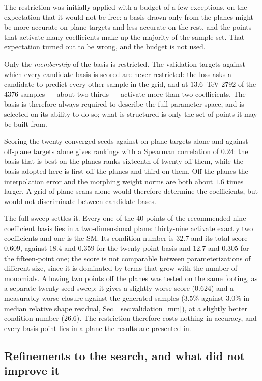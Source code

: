 The restriction was initially applied with a budget of a few exceptions, on the
expectation that it would not be free: a basis drawn only from the planes might
be more accurate on plane targets and less accurate on the rest, and the points
that activate many coefficients make up the majority of the sample set. That
expectation turned out to be wrong, and the budget is not used.

Only the \emph{membership} of the basis is restricted. The
validation targets against which every candidate basis is scored are never restricted:
the loss asks a candidate to predict every other sample in the grid, and at $13.6$~TeV
$2792$ of the $4376$ samples --- about two thirds --- activate more than two
coefficients. The basis is therefore always required to describe the full parameter
space, and is selected on its ability to do so; what is structured is only the set of
points it may be built from.

Scoring the twenty converged seeds against on-plane targets alone and against
off-plane targets alone gives rankings with a Spearman correlation of $0.24$: the basis
that is best on the planes ranks sixteenth of twenty off them, while the basis adopted
here is first off the planes and third on them. Off the planes the interpolation error
and the morphing weight norms are both about $1.6$ times larger. A grid of plane scans
alone would therefore determine the coefficients, but would not discriminate between
candidate bases.

The full sweep settles it. Every one of the $40$ points of the recommended
nine-coefficient basis lies in a two-dimensional plane: thirty-nine activate
exactly two coefficients and one is the SM. Its condition number is
$32.7$ and its total score $0.609$, against $18.4$ and $0.359$ for the
twenty-point basis and $12.7$ and $0.305$ for the fifteen-point one; the score is
not comparable between parameterizations of different size, since it is dominated
by terms that grow with the number of monomials. Allowing two points off the
planes was tested on the same footing, as a separate twenty-seed sweep: it gives
a slightly worse score ($0.624$) and a measurably worse closure against the
generated samples ($3.5\%$ against $3.0\%$ in median relative shape residual,
Sec.~\ref{sec:validation_mm}), at a slightly better condition number ($26.6$).
The restriction therefore costs nothing in accuracy, and every basis point lies in a
plane the results are presented in.

\subsection{Refinements to the search, and what did not improve it}
\label{sec:appendix_basis_refinements}
\label{sec:basis_difficulty}

